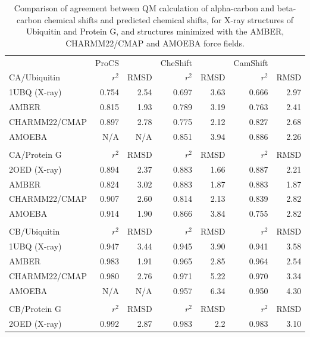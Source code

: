 \begin{table}[h]
    \caption{Comparison of agreement between QM calculation of alpha-carbon and beta-carbon chemical shifts and predicted chemical shifts, for X-ray structures of Ubiquitin and Protein G, and structures minimized with the AMBER, CHARMM22/CMAP and AMOEBA force fields.}
    \begin{center}
    \begin{threeparttable}
    \begin{tabular}{l r r r r r r}
               & ProCS  &       &  CheShift&      &  CamShift& \\
CA/Ubiquitin   & $r^2$  & RMSD  &  $r^2$   &RMSD  &  $r^2$   &RMSD\\\hline
1UBQ (X-ray)   & 0.754  & 2.54  &  0.697   &3.63  &  0.666   &2.97\\
AMBER          & 0.815  & 1.93  &  0.789   &3.19  &  0.763   &2.41\\
CHARMM22/CMAP  & 0.897  & 2.78  &  0.775   &2.12  &  0.827   &2.68\\
AMOEBA         & N/A    & N/A   &  0.851   &3.94  &  0.886   &2.26\\
 &&&&&&\\
CA/Protein G   & $r^2$  & RMSD  &  $r^2$   &RMSD  &  $r^2$   &RMSD\\\hline
2OED (X-ray)   & 0.894  & 2.37  &  0.883   &1.66  &  0.887   &2.21\\
AMBER          & 0.824  & 3.02  &  0.883   &1.87  &  0.883   &1.87\\
CHARMM22/CMAP  & 0.907  & 2.60  &  0.814   &2.13  &  0.839   &2.82\\
AMOEBA         & 0.914  & 1.90  &  0.866   &3.84  &  0.755   &2.82\\
 &&&&&&\\
CB/Ubiquitin   & $r^2$  & RMSD  &  $r^2$   &RMSD  &  $r^2$   &RMSD\\\hline
1UBQ (X-ray)   & 0.947  & 3.44  &  0.945   &3.90  &  0.941   &3.58\\
AMBER          & 0.983  & 1.91  &  0.965   &2.85  &  0.964   &2.54\\
CHARMM22/CMAP  & 0.980  & 2.76  &  0.971   &5.22  &  0.970   &3.34\\
AMOEBA         & N/A    & N/A   &  0.957   &6.34  &  0.950   &4.30\\
 &&&&&&\\
CB/Protein G   & $r^2$  & RMSD  &  $r^2$   &RMSD  &  $r^2$   &RMSD\\\hline
2OED (X-ray)   & 0.992  & 2.87  &  0.983   &2.2   &  0.983   &3.10\\

\end{tabular}
\end{threeparttable}
\end{center}
\end{table}
